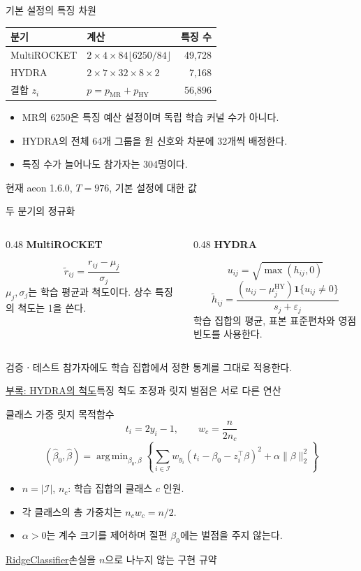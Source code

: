 \documentclass[aspectratio=169,11pt]{beamer}
\newcommand{\ind}{\mathbf 1}
\newcommand{\src}[1]{\par\vfill{\scriptsize\color{gray}#1}\par}
\newcommand{\lead}[1]{{\color{ink}\bfseries #1}\par\vspace{1.5mm}}
\DeclareMathOperator{\MR}{MR}
\DeclareMathOperator{\HY}{HY}
\DeclareMathOperator*{\argmin}{arg\,min}
\begin{document}
\begin{frame}[t]{기본 설정의 특징 차원}
\begin{tabularx}{\linewidth}{@{}lXr@{}}
\toprule 분기 & 계산 & 특징 수\\ \midrule
MultiROCKET & \(2\times4\times84\lfloor6250/84\rfloor\) & 49,728\\
HYDRA & \(2\times7\times32\times8\times2\) & 7,168\\ \midrule
결합 \(z_i\) & \(p=p_{\MR}+p_{\HY}\) & 56,896\\ \bottomrule
\end{tabularx}
\vspace{2mm}
\begin{itemize}
 \item MR의 6250은 특징 예산 설정이며 독립 학습 커널 수가 아니다.
 \item HYDRA의 전체 64개 그룹을 원 신호와 차분에 32개씩 배정한다.
 \item 특징 수가 늘어나도 참가자는 304명이다.
\end{itemize}
\src{현재 aeon 1.6.0, \(T=976\), 기본 설정에 대한 값}
\end{frame}

\begin{frame}[t]{두 분기의 정규화}
\begin{columns}[T,onlytextwidth]
\begin{column}{0.48\textwidth}
\lead{MultiROCKET}
\[
 \widetilde r_{ij}=\frac{r_{ij}-\mu_j}{\sigma_j}
\]
\small
\(\mu_j,\sigma_j\)는 학습 평균과 척도이다. 상수 특징의 척도는 1을 쓴다.
\end{column}
\begin{column}{0.48\textwidth}
\lead{HYDRA}
\[
 u_{ij}=\sqrt{\max(h_{ij},0)}
\]
\[
 \widetilde h_{ij}=
 \frac{(u_{ij}-\mu_j^{\HY})\ind\{u_{ij}\neq0\}}{s_j+\varepsilon_j}
\]
\small
학습 집합의 평균, 표본 표준편차와 영점 빈도를 사용한다.
\end{column}
\end{columns}
\vspace{2mm}
\normalsize
검증ㆍ테스트 참가자에도 학습 집합에서 정한 통계를 그대로 적용한다.
\src{\hyperlink{sparse-exact}{부록: HYDRA의 척도}\quad 특징 척도 조정과 릿지 벌점은 서로 다른 연산}
\end{frame}

\begin{frame}[t]{클래스 가중 릿지 목적함수}
\[
 t_i=2y_i-1,\qquad w_c=\frac{n}{2n_c}
\]
\[
 (\widehat\beta_0,\widehat\beta)=
 \argmin_{\beta_0,\beta}
 \left\{\sum_{i\in\mathcal I}w_{y_i}
 (t_i-\beta_0-z_i^\top\beta)^2+\alpha\|\beta\|_2^2\right\}
\]
\begin{itemize}
 \item \(n=|\mathcal I|\), \(n_c\): 학습 집합의 클래스 \(c\) 인원.
 \item 각 클래스의 총 가중치는 \(n_cw_c=n/2\).
 \item \(\alpha>0\)는 계수 크기를 제어하며 절편 \(\beta_0\)에는 벌점을 주지 않는다.
\end{itemize}
\src{\hyperlink{ref-code}{RidgeClassifier}\quad 손실을 \(n\)으로 나누지 않는 구현 규약}
\end{frame}
\end{document}
